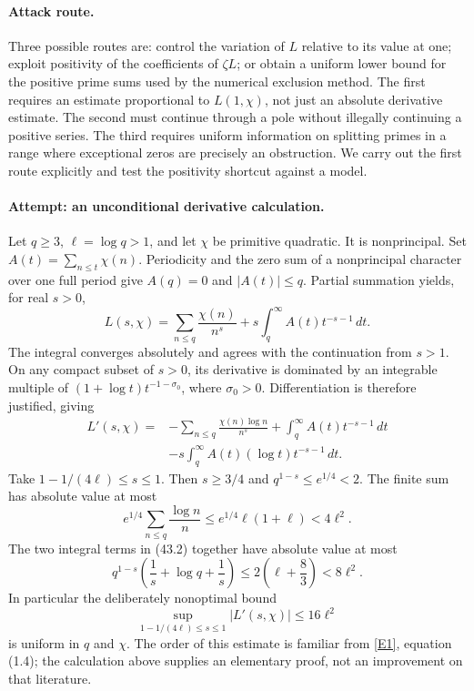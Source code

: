 \documentclass[11pt,a4paper]{article}
\newcommand{\eref}[2]{\hyperlink{extra:#1:#2}{[E#2]}}
\numberwithin{equation}{section}
\begin{document}
\paragraph{Attack route.}
Three possible routes are: control the variation of $L$ relative to its
value at one; exploit positivity of the coefficients of $\zeta L$; or
obtain a uniform lower bound for the positive prime sums used by the
numerical exclusion method. The first requires an estimate proportional
to $L(1,\chi)$, not just an absolute derivative estimate. The second must
continue through a pole without illegally continuing a positive series.
The third requires uniform information on splitting primes in a range
where exceptional zeros are precisely an obstruction. We carry out the
first route explicitly and test the positivity shortcut against a model.

\paragraph{Attempt: an unconditional derivative calculation.}
Let $q\ge3$, $\ell=\log q>1$, and let $\chi$ be primitive quadratic.
It is nonprincipal. Set $A(t)=\sum_{n\le t}\chi(n)$. Periodicity and the
zero sum of a nonprincipal character over one full period give
$A(q)=0$ and $|A(t)|\le q$. Partial summation yields, for real $s>0$,
\[
 L(s,\chi)=\sum_{n\le q}\frac{\chi(n)}{n^s}
               +s\int_q^\infty A(t)t^{-s-1}\,dt. \tag{43.1}
\]
The integral converges absolutely and agrees with the continuation from
$s>1$. On any compact subset of $s>0$, its derivative is dominated by an
integrable multiple of $(1+\log t)t^{-1-\sigma_0}$, where
$\sigma_0>0$. Differentiation is therefore justified, giving
\begin{align*}
 L'(s,\chi)={}&-\sum_{n\le q}\frac{\chi(n)\log n}{n^s}
       +\int_q^\infty A(t)t^{-s-1}\,dt\\
       &-s\int_q^\infty A(t)(\log t)t^{-s-1}\,dt. \tag{43.2}
\end{align*}
Take $1-1/(4\ell)\le s\le1$. Then $s\ge3/4$ and
$q^{1-s}\le e^{1/4}<2$. The finite sum has absolute value at most
\[
 e^{1/4}\sum_{n\le q}\frac{\log n}{n}
 \le e^{1/4}\ell(1+\ell)<4\ell^2.
\]
The two integral terms in (43.2) together have absolute value at most
\[
 q^{1-s}\left(\frac1s+\log q+\frac1s\right)
 \le2\left(\ell+\frac83\right)<8\ell^2.
\]
In particular the deliberately nonoptimal bound
\[
 \sup_{1-1/(4\ell)\le s\le1}|L'(s,\chi)|\le16\ell^2 \tag{43.3}
\]
is uniform in $q$ and $\chi$. The order of this estimate is familiar from
\eref{1509}{1}, equation (1.4); the calculation above supplies an elementary
proof, not an improvement on that literature.
\end{document}
